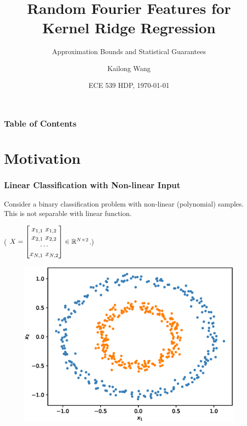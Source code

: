 \documentclass[10pt]{../formats/RU}
\title[Random Fourier Features]{Random Fourier Features for Kernel Ridge Regression}
\subtitle{Approximation Bounds and Statistical Guarantees}
\author[Kai] %
{Kailong Wang\inst{1} 
}
\institute[Rutgers] %
{
  \inst{1}%
  Ph.D. of ECE\\
  Rutgers University University
}
\date[\today] %
{ECE 539 HDP, \today}
\begin{document}
\frame{\titlepage}
\begin{frame}
\frametitle{Table of Contents}
\tableofcontents
\end{frame}


\section{Motivation}
\begin{frame}
  \frametitle{Linear Classification with Non-linear Input}
  Consider a binary classification problem with non-linear (\eg polynomial) samples. This is not separable with linear function. 

  (\eg %
  $X = {
    \begin{bmatrix}
      x_{1,1} \ x_{1,2} \\
      x_{2,1} \ x_{2,2} \\
      \cdots \\
      x_{N,1} \ x_{N,2}
    \end{bmatrix}
  }\in \mathbb{R}^{N\times 2}$.)
  \begin{figure}
    \includegraphics[height=0.5\textheight]{./figs/2d_poly_circle.eps}%
  \end{figure}
\end{frame}
\end{document}
